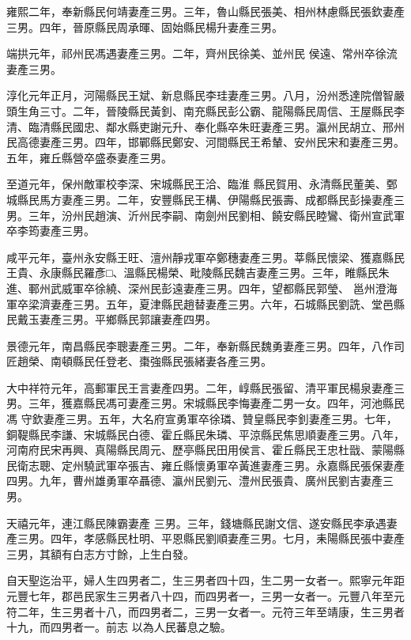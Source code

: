 \begin{pinyinscope}
 雍熙二年，奉新縣民何靖妻產三男。三年，魯山縣民張美、相州林慮縣民張欽妻產三男。四年，晉原縣民周承暉、固始縣民楊升妻產三男。



 端拱元年，祁州民馮遇妻產三男。二年，齊州民徐美、並州民
 侯遠、常州卒徐流妻產三男。



 淳化元年正月，河陽縣民王斌、新息縣民李珪妻產三男。八月，汾州悉達院僧智嚴頭生角三寸。二年，晉陵縣民黃釗、南充縣民彭公霸、龍陽縣民周信、王屋縣民李清、臨清縣民國忠、鄰水縣吏謝元升、奉化縣卒朱旺妻產三男。瀛州民胡立、邢州民高德妻產三男。四年，邯鄲縣民鄭安、河間縣民王希輦、安州民宋和妻產三男。五年，雍丘縣營卒盛泰妻產三男。



 至道元年，保州敵軍校李深、宋城縣民王洽、臨淮
 縣民賀用、永清縣民董美、鄄城縣民馬方妻產三男。二年，安豐縣民王構、伊陽縣民張壽、成都縣民彭操妻產三男。三年，汾州民趙演、沂州民李嗣、南劍州民劉相、饒安縣民睦鸞、衛州宣武軍卒李筠妻產三男。



 咸平元年，臺州永安縣王旺、澶州靜戎軍卒鄭穗妻產三男。莘縣民懷梁、獲嘉縣民王貴、永康縣民羅彥□、溫縣民楊榮、毗陵縣民魏吉妻產三男。三年，睢縣民朱進、鄆州武威軍卒徐繞、深州民彭遠妻產三男。四年，望都縣民郭瑩、
 邕州澄海軍卒梁濟妻產三男。五年，夏津縣民趙替妻產三男。六年，石城縣民劉詵、堂邑縣民戴玉妻產三男。平鄉縣民郭讓妻產四男。



 景德元年，南昌縣民李聰妻產三男。二年，奉新縣民魏勇妻產三男。四年，八作司匠趙榮、南頓縣民任登老、棗強縣民張緒妻各產三男。



 大中祥符元年，高郵軍民王言妻產四男。二年，崞縣民張留、清平軍民楊泉妻產三男。三年，獲嘉縣民馮可妻產三男。宋城縣民李悔妻產二男一女。四年，河池縣民馮
 守欽妻產三男。五年，大名府宣勇軍卒徐璘、贊皇縣民李釗妻產三男。七年，銅鞮縣民李謙、宋城縣民白德、霍丘縣民朱璘、平涼縣民焦思順妻產三男。八年，河南府民宋再興、真陽縣民周元、歷亭縣民田用侯言、霍丘縣民王忠杜戩、蒙陽縣民衛志聰、定州驍武軍卒張吉、雍丘縣懷勇軍卒黃進妻產三男。永嘉縣民張保妻產四男。九年，曹州雄勇軍卒聶德、瀛州民劉元、澧州民張貴、廣州民劉吉妻產三男。



 天禧元年，連江縣民陳霸妻產
 三男。三年，錢塘縣民謝文信、遂安縣民李承遇妻產三男。四年，孝感縣民杜明、平恩縣民劉順妻產三男。七月，耒陽縣民張中妻產三男，其額有白志方寸餘，上生白發。



 自天聖迄治平，婦人生四男者二，生三男者四十四，生二男一女者一。熙寧元年距元豐七年，郡邑民家生三男者八十四，而四男者一，三男一女者一。元豐八年至元符二年，生三男者十八，而四男者二，三男一女者一。元符三年至靖康，生三男者十九，而四男者一。前志
 以為人民蕃息之驗。




\end{pinyinscope}
